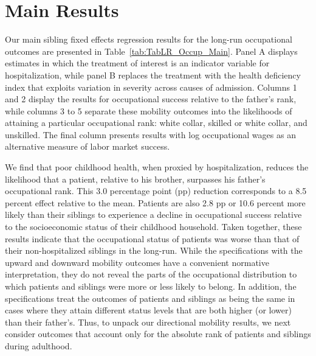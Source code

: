 \documentclass[12pt,english]{article}
\begin{document}
\section[Main Results]{Main Results\label{sec:MainResults}}

Our main sibling fixed effects regression results for the long-run occupational outcomes are presented in Table~\ref{tab:TabLR_Occup_Main}. Panel A displays estimates in which the treatment of interest is an indicator variable for hospitalization, while panel B replaces the treatment with the health deficiency index that exploits variation in severity across causes of admission. Columns 1 and 2 display the results for occupational success relative to the father's rank, while columns 3 to 5 separate these mobility outcomes into the likelihoods of attaining a particular occupational rank: white collar, skilled or white collar, and unskilled. The final column presents results with log occupational wages as an alternative measure of labor market success. 

We find that poor childhood health, when proxied by hospitalization, reduces the likelihood that a patient, relative to his brother, surpasses his father's occupational rank. This 3.0 percentage point (pp) reduction corresponds to a 8.5 percent effect relative to the mean. Patients are also 2.8 pp or 10.6 percent more likely than their siblings to experience a decline in occupational success relative to the socioeconomic status of their childhood household. Taken together, these results indicate that the occupational status of patients was worse than that of their non-hospitalized siblings in the long-run. While the specifications with the upward and downward mobility outcomes have a convenient normative interpretation, they do not reveal the parts of the occupational distribution to which patients and siblings were more or less likely to belong. In addition, the specifications treat the outcomes of patients and siblings as being the same in cases where they attain different status levels that are both higher (or lower) than their father's. Thus, to unpack our directional mobility results, we next consider outcomes that account only for the absolute rank of patients and siblings during adulthood.
\end{document}
